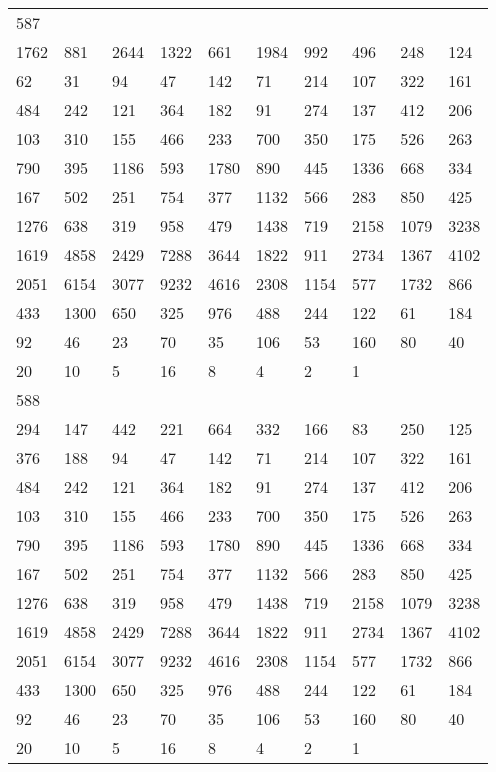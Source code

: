 \begin{longtable}{*{10}{l}}
587&&&&&&&&&\\
1762& 881& 2644& 1322& 661& 1984& 992& 496& 248& 124\\
62& 31& 94& 47& 142& 71& 214& 107& 322& 161\\
484& 242& 121& 364& 182& 91& 274& 137& 412& 206\\
103& 310& 155& 466& 233& 700& 350& 175& 526& 263\\
790& 395& 1186& 593& 1780& 890& 445& 1336& 668& 334\\
167& 502& 251& 754& 377& 1132& 566& 283& 850& 425\\
1276& 638& 319& 958& 479& 1438& 719& 2158& 1079& 3238\\
1619& 4858& 2429& 7288& 3644& 1822& 911& 2734& 1367& 4102\\
2051& 6154& 3077& 9232& 4616& 2308& 1154& 577& 1732& 866\\
433& 1300& 650& 325& 976& 488& 244& 122& 61& 184\\
92& 46& 23& 70& 35& 106& 53& 160& 80& 40\\
20& 10& 5& 16& 8& 4& 2& 1& \\

588&&&&&&&&&\\
294& 147& 442& 221& 664& 332& 166& 83& 250& 125\\
376& 188& 94& 47& 142& 71& 214& 107& 322& 161\\
484& 242& 121& 364& 182& 91& 274& 137& 412& 206\\
103& 310& 155& 466& 233& 700& 350& 175& 526& 263\\
790& 395& 1186& 593& 1780& 890& 445& 1336& 668& 334\\
167& 502& 251& 754& 377& 1132& 566& 283& 850& 425\\
1276& 638& 319& 958& 479& 1438& 719& 2158& 1079& 3238\\
1619& 4858& 2429& 7288& 3644& 1822& 911& 2734& 1367& 4102\\
2051& 6154& 3077& 9232& 4616& 2308& 1154& 577& 1732& 866\\
433& 1300& 650& 325& 976& 488& 244& 122& 61& 184\\
92& 46& 23& 70& 35& 106& 53& 160& 80& 40\\
20& 10& 5& 16& 8& 4& 2& 1& \\


\end{longtable}
